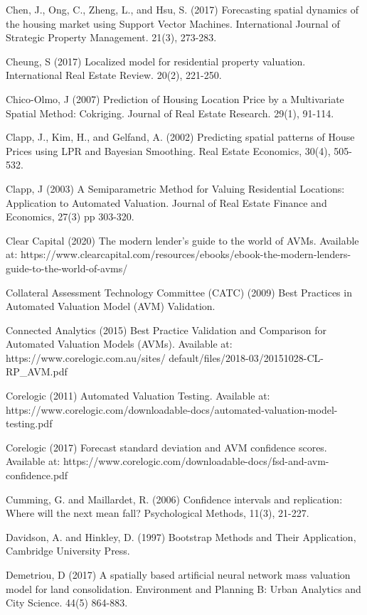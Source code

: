 \documentclass[colTwo]{anon}
\theoremstyle{definition}
\begin{document}
\begin{thebibliography}{50}
\harvarditem{}{}{}Chen, J., Ong, C., Zheng, L., and Hsu, S. (2017) Forecasting spatial dynamics of the housing market using Support Vector Machines. International Journal of Strategic Property Management. 21(3), 273-283. 

\harvarditem{}{}{}Cheung, S (2017) Localized model for residential property valuation. International Real Estate Review. 20(2), 221-250. 

\harvarditem{}{}{}Chico-Olmo, J (2007) Prediction of Housing Location Price by a Multivariate Spatial Method: Cokriging. Journal of Real Estate Research. 29(1), 91-114. 

\harvarditem{}{}{}Clapp, J., Kim, H., and Gelfand, A. (2002) Predicting spatial patterns of House Prices using LPR and Bayesian Smoothing. Real Estate Economics, 30(4), 505-532. 

\harvarditem{}{}{}Clapp, J (2003) A Semiparametric Method for Valuing Residential Locations: Application to Automated Valuation. Journal of Real Estate Finance and Economics, 27(3) pp 303-320. 

\harvarditem{}{}{}Clear Capital (2020) The modern lender’s guide to the world of AVMs. Available at: https://www.clearcapital.com/resources/ebooks/ebook-the-modern-lenders-guide-to-the-world-of-avms/

\harvarditem{}{}{}Collateral Assessment Technology Committee (CATC) (2009) Best Practices in Automated Valuation Model (AVM) Validation. 

\harvarditem{}{}{}Connected Analytics (2015) Best Practice Validation and Comparison for Automated Valuation Models (AVMs). Available at: https://www.corelogic.com.au/sites/ default/files/2018-03/20151028-CL-RP\_AVM.pdf

\harvarditem{}{}{}Corelogic (2011) Automated Valuation Testing. Available at: https://www.corelogic.com/downloadable-docs/automated-valuation-model-testing.pdf
		
\harvarditem{}{}{}Corelogic (2017) Forecast standard deviation and AVM confidence scores. Available at: https://www.corelogic.com/downloadable-docs/fsd-and-avm-confidence.pdf

\harvarditem{}{}{} Cumming, G. and Maillardet, R. (2006) Confidence intervals and replication: Where will the next mean fall? Psychological Methods, 11(3), 21-227.

\harvarditem{}{}{}Davidson, A. and Hinkley, D. (1997) Bootstrap Methods and Their Application, Cambridge University Press.  

\harvarditem{}{}{}Demetriou, D (2017) A spatially based artificial neural network mass valuation model for land consolidation. Environment and Planning B: Urban Analytics and City Science. 44(5) 864-883. 


\end{thebibliography}
\end{document}
